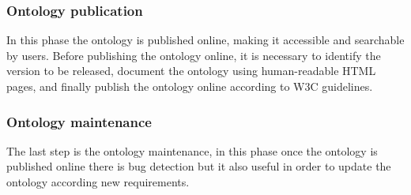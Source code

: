 \subsubsection{Ontology publication}
In this phase the ontology is published online, making it accessible and searchable by users. Before publishing the ontology online, it is necessary to identify the version to be released, document the ontology using human-readable HTML pages, and finally publish the ontology online according to W3C guidelines.\cite{ontology_online}

\subsubsection{Ontology maintenance}
The last step is the ontology maintenance, in this phase once the ontology is published online there is bug detection but it also useful in order to update the ontology according new requirements.

